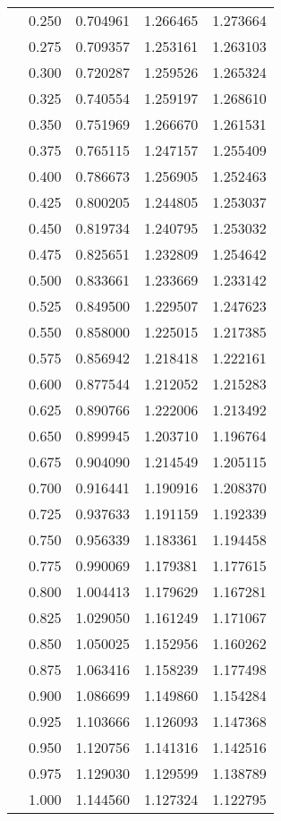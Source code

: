 \begin{tabular}{llrrr}
         & 0.250 &   0.704961 &   1.266465 &   1.273664 \\
         & 0.275 &   0.709357 &   1.253161 &   1.263103 \\
         & 0.300 &   0.720287 &   1.259526 &   1.265324 \\
         & 0.325 &   0.740554 &   1.259197 &   1.268610 \\
         & 0.350 &   0.751969 &   1.266670 &   1.261531 \\
         & 0.375 &   0.765115 &   1.247157 &   1.255409 \\
         & 0.400 &   0.786673 &   1.256905 &   1.252463 \\
         & 0.425 &   0.800205 &   1.244805 &   1.253037 \\
         & 0.450 &   0.819734 &   1.240795 &   1.253032 \\
         & 0.475 &   0.825651 &   1.232809 &   1.254642 \\
         & 0.500 &   0.833661 &   1.233669 &   1.233142 \\
         & 0.525 &   0.849500 &   1.229507 &   1.247623 \\
         & 0.550 &   0.858000 &   1.225015 &   1.217385 \\
         & 0.575 &   0.856942 &   1.218418 &   1.222161 \\
         & 0.600 &   0.877544 &   1.212052 &   1.215283 \\
         & 0.625 &   0.890766 &   1.222006 &   1.213492 \\
         & 0.650 &   0.899945 &   1.203710 &   1.196764 \\
         & 0.675 &   0.904090 &   1.214549 &   1.205115 \\
         & 0.700 &   0.916441 &   1.190916 &   1.208370 \\
         & 0.725 &   0.937633 &   1.191159 &   1.192339 \\
         & 0.750 &   0.956339 &   1.183361 &   1.194458 \\
         & 0.775 &   0.990069 &   1.179381 &   1.177615 \\
         & 0.800 &   1.004413 &   1.179629 &   1.167281 \\
         & 0.825 &   1.029050 &   1.161249 &   1.171067 \\
         & 0.850 &   1.050025 &   1.152956 &   1.160262 \\
         & 0.875 &   1.063416 &   1.158239 &   1.177498 \\
         & 0.900 &   1.086699 &   1.149860 &   1.154284 \\
         & 0.925 &   1.103666 &   1.126093 &   1.147368 \\
         & 0.950 &   1.120756 &   1.141316 &   1.142516 \\
         & 0.975 &   1.129030 &   1.129599 &   1.138789 \\
         & 1.000 &   1.144560 &   1.127324 &   1.122795 \\
\bottomrule
\end{tabular}
